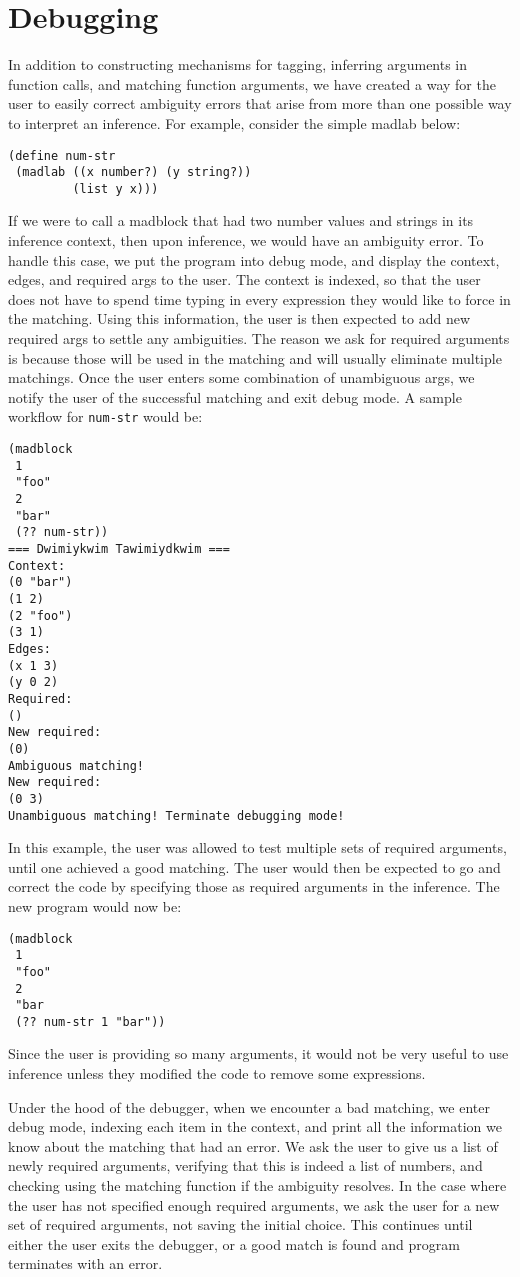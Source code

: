 \documentclass[11pt]{article}
\begin{document}
\section{Debugging}\label{debugging}

In addition to constructing mechanisms for tagging,
inferring arguments in function calls, and matching function arguments,
we have created a way for the user to easily correct ambiguity errors
that arise from more than one possible way to interpret an inference.
For example, consider the simple madlab below:
\begin{Verbatim}
(define num-str
 (madlab ((x number?) (y string?))
         (list y x)))
\end{Verbatim}
If we were to call a madblock that had two number values and strings
in its inference context,
then upon inference, we would have an ambiguity error.
To handle this case, we put the program into debug mode,
and display the context, edges, and required args to the user.
The context is indexed, so that the user does not have to spend time
typing in every expression they would like to force in the matching.
Using this information, the user is then expected to add new required args
to settle any ambiguities.
The reason we ask for required arguments is because those will be used
in the matching and will usually eliminate multiple matchings.
Once the user enters some combination of unambiguous args,
we notify the user of the successful matching and exit debug mode.
A sample workflow for \texttt{num-str} would be:
\begin{Verbatim}[samepage=false]
(madblock
 1
 "foo"
 2
 "bar"
 (?? num-str))
=== Dwimiykwim Tawimiydkwim ===
Context:
(0 "bar")
(1 2)
(2 "foo")
(3 1)
Edges:
(x 1 3)
(y 0 2)
Required:
()
New required:
(0)
Ambiguous matching!
New required:
(0 3)
Unambiguous matching! Terminate debugging mode!
\end{Verbatim}
In this example, the user was allowed to test multiple sets of required
arguments, until one achieved a good matching.
The user would then be expected to go and correct the code
by specifying those as required arguments in the inference.
The new program would now be:
\begin{Verbatim}
(madblock
 1
 "foo"
 2
 "bar
 (?? num-str 1 "bar"))
\end{Verbatim}
Since the user is providing so many arguments, it would not be very useful
to use inference unless they modified the code to remove some expressions.

Under the hood of the debugger, when we encounter a bad matching,
we enter debug mode, indexing each item in the context,
and print all the information we know about the matching that had an error.
We ask the user to give us a list of newly required arguments,
verifying that this is indeed a list of numbers,
and checking using the matching function if the ambiguity resolves.
In the case where the user has not specified enough required arguments,
we ask the user for a new set of required arguments,
not saving the initial choice.
This continues until either the user exits the debugger,
or a good match is found and program terminates with an error.
\end{document}
